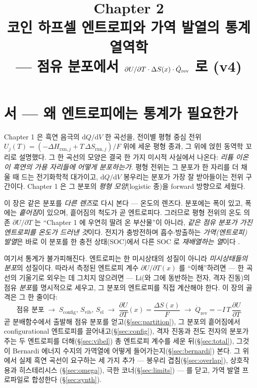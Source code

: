 \documentclass[11pt,a4paper]{article}
\title{\textbf{\LARGE Chapter 2}\\[0.35em]\Large 코인 하프셀 엔트로피와 가역 발열의 통계열역학\\[0.2em]\large — 점유 분포에서 $\partial U/\partial T\cdot\Delta S(x)\cdot\dot Q_\rev$ 로 (v4)}
\author{}\date{}
\newcommand{\dd}{\mathrm{d}}
\newcommand{\rxn}{\mathrm{rxn}}
\newcommand{\rev}{\mathrm{rev}}
\newcommand{\config}{\mathrm{config}}
\newcommand{\vibr}{\mathrm{vib}}
\newcommand{\elec}{\mathrm{el}}
\begin{document}
\maketitle

\section*{서 — 왜 엔트로피에는 통계가 필요한가}
Chapter 1 은 흑연 음극의 $\dd Q/\dd V$ 한 곡선을, 전이별 평형 중심 전위
$U_j(T)=(-\Delta H_{\rxn,j}+T\,\Delta S_{\rxn,j})/F$ 위에 세운 평형 종과, 그 위에 얹힌 동역학 꼬리로
설명했다. 그 한 곡선의 모양은 결국 한 가지 미시적 사실에서 나온다: \emph{리튬 이온이 흑연의 가용
자리들에 어떻게 분포하는가}. 평형 전위는 그 분포가 한 자리를 더 채울 때 드는 전기화학적 대가이고,
$\dd Q/\dd V$ 봉우리는 분포가 가장 잘 받아들이는 전위 구간이다. Chapter 1 은 그 분포의 \emph{평형
모양}(logistic 종)을 forward 방향으로 세웠다.

이 장은 같은 분포를 \emph{다른 렌즈}로 다시 본다 — 온도의 렌즈다. 분포에는 폭이 있고, 폭에는
\emph{흩어짐}이 있으며, 흩어짐의 척도가 곧 엔트로피다. 그러므로 평형 전위의 온도 의존
$\partial U/\partial T$ 는 ``Chapter 1 에 우연히 딸려 온 부산물''이 아니라, \emph{같은 점유 분포가
가진 엔트로피를 온도가 드러낸 것}이다. 전지가 충방전하며 흡수$\cdot$방출하는 \emph{가역(엔트로피)
발열}은 바로 이 분포를 한 충전 상태(SOC)에서 다른 SOC 로 \emph{재배열하는 열}이다 \cite{huggins2009}.

여기서 통계가 불가피해진다. 엔트로피는 한 미시상태의 성질이 아니라 \emph{미시상태들의 분포}의 성질이다.
따라서 측정된 엔트로피 계수 $\partial U/\partial T(x)$ 를 ``이해''하려면 — 한 곡선의 기울기로 외우는 데
그치지 않으려면 — Li(와 그에 동반하는 전자, 격자 진동)의 점유 \emph{분포}를 명시적으로 세우고, 그
분포의 엔트로피를 직접 계산해야 한다. 이 장의 골격은 그 한 줄이다:
\[
\boxed{\;\text{점유 분포}\;\to\;S_\config,\,S_\vibr,\,S_\elec\;\to\;\frac{\partial U}{\partial T}(x)=\frac{\Delta S(x)}{F}\;\to\;\dot Q_\rev=-I\,T\,\frac{\partial U}{\partial T}\;}
\]
곧 분배함수에서 출발해 점유 분포를 얻고(\S\ref{sec:partition}), 그 분포의 흩어짐에서
configurational 엔트로피를 끌어내고(\S\ref{sec:config}), 격자 진동과 전도 전자의 분포가 주는 두
엔트로피를 더해(\S\ref{sec:vibel}) 총 엔트로피 계수를 세운 뒤(\S\ref{sec:total}), 그것이 Bernardi
에너지 수지의 가역열에 어떻게 들어가는지(\S\ref{sec:bernardi}) 본다. 그 위에서 실제 흑연 곡선이
요구하는 세 가지 추가 — 봉우리 겹침(\S\ref{sec:overlap}), 상호작용과 히스테리시스
(\S\ref{sec:omega}), 극한 코너(\S\ref{sec:limits}) — 를 닫고, 가역 발열 프로파일로 합성한다
(\S\ref{sec:synth}).
\end{document}
